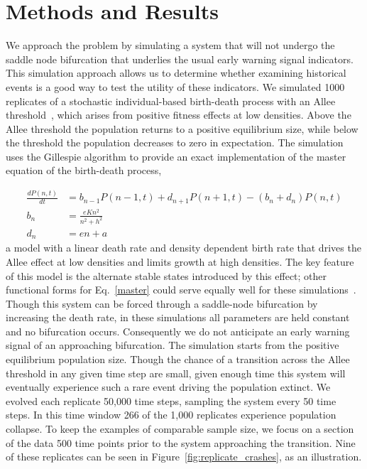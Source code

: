 \documentclass[authoryear,review,12pt]{elsarticle}
\begin{document}
\section{Methods and Results}
We approach the problem by simulating a system that will not undergo the
saddle node bifurcation that underlies the usual early warning signal
indicators.  This simulation approach allows us to determine whether
examining historical events is a good way to test the utility of these
indicators.  We simulated 1000 replicates of a stochastic individual-based
birth-death process with an Allee threshold~\citep{Courchamp2008}, which
arises from positive fitness effects at low densities.  Above the Allee
threshold the population returns to a positive equilibrium size, while
below the threshold the population decreases to zero in expectation. The
simulation uses the Gillespie algorithm to provide an exact implementation
of the master equation of the birth-death process,

\begin{align}
  \frac{dP(n,t)}{dt} &= b_{n-1} P(n-1,t) + d_{n+1}P(n+1,t) - (b_n+d_n) P(n,t)  \label{master} \\
    b_n &= \frac{e K n^2}{n^2 + h^2} \\
    d_n &= e n + a
\end{align}
a model with a linear death rate and density dependent birth rate
that drives the Allee effect at low densities and limits growth
at high densities.  The key feature of this model is the alternate
stable states introduced by this effect; other functional forms for
Eq.~\ref{master} could serve equally well for these simulations~\citep[see
\emph{e.g.}][]{Scheffer2001}.  Though this system can be forced
through a saddle-node bifurcation by increasing the death rate, in
these simulations all parameters are held constant and no bifurcation
occurs.  Consequently we do not anticipate an early warning signal of
an approaching bifurcation.  The simulation starts from the positive
equilibrium population size.  Though the chance of a transition across
the Allee threshold in any given time step are small, given enough
time this system will eventually experience such a rare event driving
the population extinct.  We evolved each replicate 50,000 time steps,
sampling the system every 50 time steps.  In this time window 266 of the
1,000 replicates experience population collapse.  To keep the examples of
comparable sample size, we focus on a section of the data 500 time points
prior to the system approaching the transition.  Nine of these replicates
can be seen in Figure~\ref{fig:replicate_crashes}, as an illustration.
\end{document}
